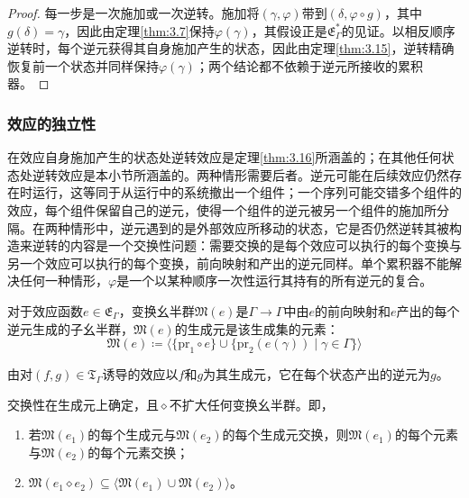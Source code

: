 \begin{proof}
每一步是一次施加或一次逆转。施加将$(\gamma, \varphi)$带到$(\delta, \varphi \circ g)$，其中$g(\delta) = \gamma$，因此由定理\ref{thm:3.7}保持$\varphi(\gamma)$，其假设正是$\mathfrak{E}^*_\Gamma$的见证。以相反顺序逆转时，每个逆元获得其自身施加产生的状态，因此由定理\ref{thm:3.15}，逆转精确恢复前一个状态并同样保持$\varphi(\gamma)$；两个结论都不依赖于逆元所接收的累积器。
\end{proof}

\subsubsection{效应的独立性}\label{subsubsec:3.1.3}

在效应自身施加产生的状态处逆转效应是定理\ref{thm:3.16}所涵盖的；在其他任何状态处逆转效应是本小节所涵盖的。两种情形需要后者。逆元可能在后续效应仍然存在时运行，这等同于从运行中的系统撤出一个组件；一个序列可能交错多个组件的效应，每个组件保留自己的逆元，使得一个组件的逆元被另一个组件的施加所分隔。在两种情形中，逆元遇到的是外部效应所移动的状态，它是否仍然逆转其被构造来逆转的内容是一个交换性问题：需要交换的是每个效应可以执行的每个变换与另一个效应可以执行的每个变换，前向映射和产出的逆元同样。单个累积器不能解决任何一种情形，$\varphi$是一个以某种顺序一次性运行其持有的所有逆元的复合。

\begin{definition}\label{def:3.17}
对于效应函数$e \in \mathfrak{E}_\Gamma$，变换幺半群$\mathfrak{M}(e)$是$\Gamma \to \Gamma$中由$e$的前向映射和$e$产出的每个逆元生成的子幺半群，$\mathfrak{M}(e)$的生成元是该生成集的元素：
\begin{equation}\label{eq:3.17}
\mathfrak{M}(e) \coloneqq \langle \{\mathrm{pr}_1 \circ e\} \cup \{\mathrm{pr}_2(e(\gamma)) \mid \gamma \in \Gamma\} \rangle
\end{equation}
\end{definition}

由对$(f, g) \in \mathfrak{T}_\Gamma$诱导的效应以$f$和$g$为其生成元，它在每个状态产出的逆元为$g$。

\begin{lemma}\label{lem:3.18}
交换性在生成元上确定，且$\diamond$不扩大任何变换幺半群。即，
\begin{enumerate}
\item 若$\mathfrak{M}(e_1)$的每个生成元与$\mathfrak{M}(e_2)$的每个生成元交换，则$\mathfrak{M}(e_1)$的每个元素与$\mathfrak{M}(e_2)$的每个元素交换；
\item $\mathfrak{M}(e_1 \diamond e_2) \subseteq \langle \mathfrak{M}(e_1) \cup \mathfrak{M}(e_2) \rangle$。
\end{enumerate}
\end{lemma}

